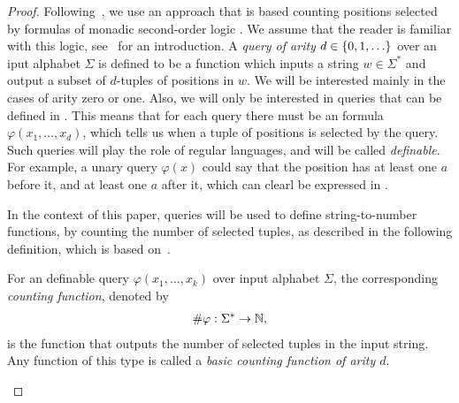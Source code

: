 \begin{proof} Following~\cite{Zpolyreg23}, we  use an approach that is based counting positions selected by formulas of  monadic second-order logic \mso. We assume that the reader is familiar with this logic, see~\cite[Section 2.1]{bojanczyk_recobook} for an introduction. 
A \emph{query of arity $d \in \{0,1,\ldots\}$} 
over an iput alphabet $\Sigma$ is defined to be a function which inputs a string  $w \in \Sigma^*$ and output a subset of $d$-tuples of positions in $w$. We will be interested mainly in the cases of arity zero or one. 
Also, we will  only be interested in queries that can be defined in \mso. This means that for each query there must be an \mso formula $\varphi(x_1,\ldots,x_d)$, which tells us when a tuple of positions is selected by the query. Such queries will play the role of regular languages, and will be called \emph{\mso definable}. For example, a unary query $\varphi(x)$ could say that the position has at least one $a$ before it, and at least one $a$ after it, which can clearl be expressed in \mso.  

In the context of this paper, queries will be used to define string-to-number functions, by counting the number of selected tuples, as described in the  following definition, which is based on~\cite{Zpolyreg23}.


\begin{definition}
       For an \mso definable query $\varphi(x_1,\ldots,x_k)$ over input alphabet $\Sigma$, the corresponding \emph{counting function}, denoted by
    \begin{align*}
    \#{\varphi} : \Sigma^* \to {\mathbb N},
    \end{align*}
    is the function that outputs the number of selected tuples in the input string. Any function of this type is called a \emph{basic counting function of arity $d$}.
\end{definition}


\end{proof}
